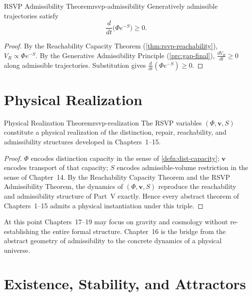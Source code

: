 \documentclass[12pt,twoside,openright]{book}
\begin{document}
\begin{theorem}{RSVP Admissibility Theorem}{rsvp-admissibility}
  Generatively admissible trajectories satisfy
  \[
    \frac{d}{dt}\bigl(\Phi e^{-S}\bigr) \ge 0.
  \]
\end{theorem}

\begin{proof}
  By the Reachability Capacity Theorem
  (\cref{thm:rsvp-reachability}), $V_R \propto \Phi e^{-S}$.
  By the Generative Admissibility Principle
  (\cref{prc:gap-final}), $\frac{dV_R}{dt} \ge 0$ along
  admissible trajectories. Substitution gives
  $\frac{d}{dt}(\Phi e^{-S}) \ge 0$.
\end{proof}

\section{Physical Realization}
\label{sec:ch16-realization}

\begin{theorem}{Physical Realization Theorem}{rsvp-realization}
  The RSVP variables $(\Phi, \mathbf{v}, S)$ constitute a
  physical realization of the distinction, repair,
  reachability, and admissibility structures developed in
  Chapters~1--15.
\end{theorem}

\begin{proof}
  $\Phi$ encodes distinction capacity in the sense of
  \cref{defn:dist-capacity}; $\mathbf{v}$ encodes transport
  of that capacity; $S$ encodes admissible-volume
  restriction in the sense of Chapter~14. By the
  Reachability Capacity Theorem and the RSVP Admissibility
  Theorem, the dynamics of $(\Phi,\mathbf{v},S)$ reproduce
  the reachability and admissibility structure of
  Part~V exactly. Hence every abstract theorem of
  Chapters~1--15 admits a physical instantiation under this
  triple.
\end{proof}

At this point Chapters~17--19 may focus on gravity and
cosmology without re-establishing the entire formal
structure. Chapter~16 is the bridge from the abstract
geometry of admissibility to the concrete dynamics of a
physical universe.

\section{Existence, Stability, and Attractors}
\label{sec:ch16-existence}
\end{document}

